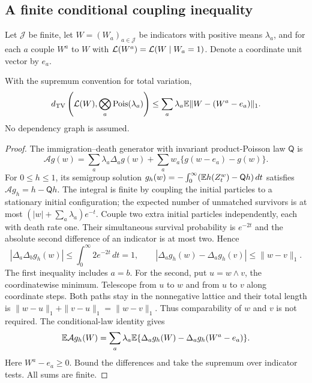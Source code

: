 \subsection{A finite conditional coupling inequality}
Let $\mathcal J$ be finite, let $W=(W_a)_{a\in\mathcal J}$ be indicators with positive means $\lambda_a$, and for each $a$ couple $W^a$ to $W$ with
$\mathcal L(W^a)=\mathcal L(W\mid W_a=1)$. Denote a coordinate unit vector by $e_a$.
\begin{lemma}\label{supp:pivot:lem:palm}
With the supremum convention for total variation,
\begin{equation}\label{supp:pivot:eq:palm}
 d_{\mathrm{TV}}\left(\mathcal L(W),\bigotimes_a\operatorname{Pois}(\lambda_a)\right)
 \le\sum_a\lambda_a\mathbb E\|W-(W^a-e_a)\|_1.
\end{equation}
No dependency graph is assumed.
\end{lemma}
\begin{proof}
The immigration--death generator with invariant product-Poisson law $\mathsf Q$ is
\[
 \mathcal A g(w)=\sum_a\lambda_a\Delta_a g(w)
                +\sum_a w_a\{g(w-e_a)-g(w)\}.
\]
For $0\le h\le1$, its semigroup solution
$g_h(w)=-\int_0^\infty(\mathbb E h(Z_t^w)-\mathsf Qh)\,dt$
satisfies $\mathcal A g_h=h-\mathsf Qh$.
The integral is finite by coupling the initial particles to a stationary initial configuration; the expected number of unmatched survivors is at most
$(|w|+\sum_a\lambda_a)e^{-t}$.
Couple two extra initial particles independently, each with death rate one. Their simultaneous survival probability is $e^{-2t}$ and the absolute second difference of an indicator is at most two. Hence
\[
 |\Delta_a\Delta_b g_h(w)|\le\int_0^\infty2e^{-2t}\,dt=1,
 \qquad
 |\Delta_a g_h(w)-\Delta_a g_h(v)|\le\|w-v\|_1.
\]
The first inequality includes $a=b$. For the second, put
$u=w\wedge v$, the coordinatewise minimum. Telescope from $u$ to $w$
and from $u$ to $v$ along coordinate steps. Both paths stay in the
nonnegative lattice and their total length is
$\|w-u\|_1+\|v-u\|_1=\|w-v\|_1$.
Thus comparability of $w$ and $v$ is not required. The conditional-law identity gives
\[
 \mathbb E\mathcal A g_h(W)=\sum_a\lambda_a
       \mathbb E\{\Delta_a g_h(W)-\Delta_a g_h(W^a-e_a)\}.
\]
Here $W^a-e_a\ge0$. Bound the differences and take the supremum over indicator tests. All sums are finite.
\end{proof}

